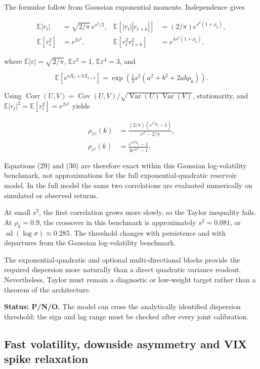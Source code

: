 \documentclass[11pt,a4paper]{article}
\newcommand{\E}{\mathbb{E}}
\newcommand{\Var}{\operatorname{Var}}
\newcommand{\Cov}{\operatorname{Cov}}
\newcommand{\Corr}{\operatorname{Corr}}
\begin{document}
The formulae follow from Gaussian exponential moments.  Independence gives

\begin{align*}
\E|r_t|&=\sqrt{2/\pi}\,e^{s^2/2},
&\E[|r_t||r_{t+k}|]&=(2/\pi)e^{s^2(1+\rho_k)},\\
\E[r_t^2]&=e^{2s^2},
&\E[r_t^2r_{t+k}^2]&=e^{4s^2(1+\rho_k)},
\end{align*}

where \(\E|\varepsilon|=\sqrt{2/\pi}\), \(\E\varepsilon^2=1\),
\(\E\varepsilon^4=3\), and

\begin{equation*}
\E[e^{aX_t+bX_{t+k}}]
=\exp\!\left(\tfrac12s^2(a^2+b^2+2ab\rho_k)\right).
\end{equation*}

Using \(\Corr(U,V)=\Cov(U,V)/\sqrt{\Var(U)\Var(V)}\), stationarity, and
\(\E|r_t|^2=\E[r_t^2]=e^{2s^2}\) yields

\begin{align}
\rho_{|r|}(k)
&=\frac{(2/\pi)\left(e^{s^2\rho_k}-1\right)}
        {e^{s^2}-2/\pi}, \label{eq:taylor-absolute}\\
\rho_{r^2}(k)
&=\frac{e^{4s^2\rho_k}-1}{3e^{4s^2}-1}.
\label{eq:taylor-square}
\end{align}

Equations (29) and (30) are therefore exact within this Gaussian log-volatility benchmark, not
approximations for the full exponential-quadratic reservoir model.  In the full model the same
two correlations are evaluated numerically on simulated or observed returns.

At small \(s^2\), the first correlation grows more slowly, so the Taylor inequality fails.
At \(\rho_k=0.9\), the crossover in this benchmark is approximately
\(s^2=0.081\), or \(\operatorname{sd}(\log\sigma)\approx0.285\). The threshold changes with
persistence and with departures from the Gaussian log-volatility benchmark.

The exponential-quadratic and optional multi-directional blocks provide the required
dispersion more naturally than a direct quadratic variance readout. Nevertheless, Taylor must
remain a diagnostic or low-weight target rather than a theorem of the architecture.

\textbf{Status: P/N/O.} The model can cross the analytically identified dispersion threshold;
the sign and lag range must be checked after every joint calibration.

\subsection{Fast volatility, downside asymmetry and VIX spike relaxation}
\end{document}
